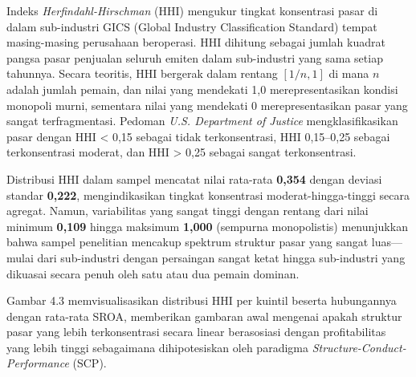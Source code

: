 \documentclass[12pt,a4paper]{article}
\begin{document}
Indeks \emph{Herfindahl-Hirschman} (HHI) mengukur tingkat konsentrasi
pasar di dalam sub-industri GICS (Global Industry Classification
Standard) tempat masing-masing perusahaan beroperasi. HHI dihitung
sebagai jumlah kuadrat pangsa pasar penjualan seluruh emiten dalam
sub-industri yang sama setiap tahunnya. Secara teoritis, HHI bergerak
dalam rentang \([1/n, 1]\) di mana \(n\) adalah jumlah pemain, dan nilai
yang mendekati 1,0 merepresentasikan kondisi monopoli murni, sementara
nilai yang mendekati 0 merepresentasikan pasar yang sangat
terfragmentasi. Pedoman \emph{U.S. Department of Justice}
mengklasifikasikan pasar dengan HHI \textless{} 0,15 sebagai tidak
terkonsentrasi, HHI 0,15--0,25 sebagai terkonsentrasi moderat, dan HHI
\textgreater{} 0,25 sebagai sangat terkonsentrasi.

Distribusi HHI dalam sampel mencatat nilai rata-rata \textbf{0,354}
dengan deviasi standar \textbf{0,222}, mengindikasikan tingkat
konsentrasi moderat-hingga-tinggi secara agregat. Namun, variabilitas
yang sangat tinggi dengan rentang dari nilai minimum \textbf{0,109}
hingga maksimum \textbf{1,000} (sempurna monopolistis) menunjukkan bahwa
sampel penelitian mencakup spektrum struktur pasar yang sangat
luas---mulai dari sub-industri dengan persaingan sangat ketat hingga
sub-industri yang dikuasai secara penuh oleh satu atau dua pemain
dominan.

Gambar 4.3 memvisualisasikan distribusi HHI per kuintil beserta
hubungannya dengan rata-rata SROA, memberikan gambaran awal mengenai
apakah struktur pasar yang lebih terkonsentrasi secara linear
berasosiasi dengan profitabilitas yang lebih tinggi sebagaimana
dihipotesiskan oleh paradigma \emph{Structure-Conduct-Performance}
(SCP).
\end{document}
